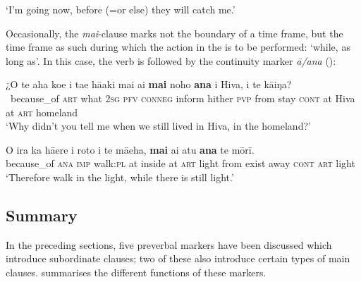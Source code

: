 \glt 
‘I’m going now, before (=or else) they will catch me.’ \textstyleExampleref{[R304.117]} 
\z

Occasionally, the \textit{mai}{}-clause marks not the boundary of a time frame, but the time frame as such during which the action in the  is to be performed: ‘while, as long as’. In this case, the verb is followed by the continuity marker \textit{{\ꞌ}ā/{\ꞌ}ana} ():

\ea\label{ex:11.208}
\gll ¿{\ꞌ}O te aha koe i ta{\ꞌ}e hā{\ꞌ}aki mai ai \textbf{mai} noho \textbf{{\ꞌ}ana}  {\ꞌ}i Hiva, {\ꞌ}i te kāiŋa?\\
~because\_of \textsc{art} what \textsc{2sg} \textsc{pfv} \textsc{conneg} inform hither \textsc{pvp} from stay \textsc{cont}  at Hiva at \textsc{art} homeland\\

\glt 
‘Why didn’t you tell me when we still lived in Hiva, in the homeland?’ \textstyleExampleref{[Ley-2-07.028]}
\z

\ea\label{ex:11.209}
\gll {\ꞌ}O ira ka hā{\ꞌ}ere {\ꞌ}i roto i te mā{\ꞌ}eha, \textbf{mai} ai atu \textbf{{\ꞌ}ana} te mōrī. \\
because\_of \textsc{ana} \textsc{imp} walk:\textsc{pl} at inside at \textsc{art} light from exist away \textsc{cont} \textsc{art} light \\

\glt 
‘Therefore walk in the light, while there is still light.’ \textstyleExampleref{[John 12:35]}\textstyleExampleref{} 
\z
{}

\subsection{Summary}\label{sec:11.5.6}

In the preceding sections, five preverbal markers have been discussed which introduce subordinate clauses; two of these also introduce certain types of main clauses.  summarises the different functions of these markers.

